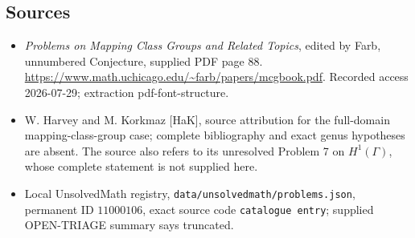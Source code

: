 \documentclass[11pt]{article}
\begin{document}
\subsection{Sources}
\begin{itemize}
\item \emph{Problems on Mapping Class Groups and Related Topics}, edited by Farb, unnumbered Conjecture, supplied PDF page 88. \url{https://www.math.uchicago.edu/~farb/papers/mcgbook.pdf}. Recorded access 2026-07-29; extraction pdf-font-structure.
\item W. Harvey and M. Korkmaz [HaK], source attribution for the full-domain mapping-class-group case; complete bibliography and exact genus hypotheses are absent. The source also refers to its unresolved Problem 7 on \(H^1(\Gamma)\), whose complete statement is not supplied here.
\item Local UnsolvedMath registry, \texttt{data/unsolvedmath/problems.json}, permanent ID \(11000106\), exact source code \texttt{catalogue entry}; supplied OPEN-TRIAGE summary says truncated.
\end{itemize}
\end{document}

